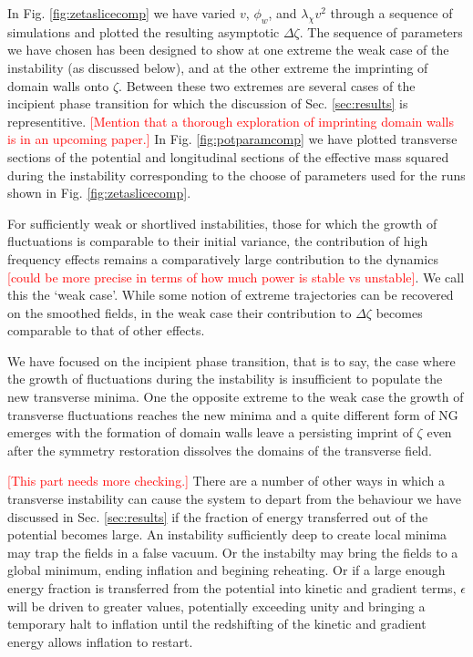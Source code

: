 In Fig. \ref{fig:zetaslicecomp} we have varied $v$, $\phi_w$, and $\lambda_\chi v^2$ through a sequence of simulations and plotted the resulting asymptotic $\Delta\zeta$. The sequence of parameters we have chosen has been designed to show at one extreme the weak case of the instability (as discussed below), and at the other extreme the imprinting of domain walls onto $\zeta$. Between these two extremes are several cases of the incipient phase transition for which the discussion of Sec. \ref{sec:results} is representitive.
\textcolor{red}{[Mention that a thorough exploration of imprinting domain walls is in an upcoming paper.]}
In Fig. \ref{fig:potparamcomp} we have plotted transverse sections of the potential and longitudinal sections of the effective mass squared during the instability corresponding to the choose of parameters used for the runs shown in Fig. \ref{fig:zetaslicecomp}.

For sufficiently weak or shortlived instabilities, those for which the growth of fluctuations is comparable to their initial variance, the contribution of high frequency effects remains a comparatively large contribution to the dynamics \textcolor{red}{[could be more precise in terms of how much power is stable vs unstable]}.
We call this the `weak case'.
While some notion of extreme trajectories can be recovered on the smoothed fields, in the weak case their contribution to $\Delta\zeta$ becomes comparable to that of other effects.

We have focused on the incipient phase transition, that is to say, the case where the growth of fluctuations during the instability is insufficient to populate the new transverse minima. One the opposite extreme to the weak case the growth of transverse fluctuations reaches the new minima and a quite different form of NG emerges with the formation of domain walls leave a persisting imprint of $\zeta$ even after the symmetry restoration dissolves the domains of the transverse field.

\textcolor{red}{[This part needs more checking.]}
There are a number of other ways in which a transverse instability can cause the system to depart from the behaviour we have discussed in Sec. \ref{sec:results} if the fraction of energy transferred out of the potential becomes large.
An instability sufficiently deep to create local minima may trap the fields in a false vacuum.
Or the instabilty may bring the fields to a global minimum, ending inflation and begining reheating.
Or if a large enough energy fraction is transferred from the potential into kinetic and gradient terms, $\epsilon$ will be driven to greater values, potentially exceeding unity and bringing a temporary halt to inflation until the redshifting of the kinetic and gradient energy allows inflation to restart.

